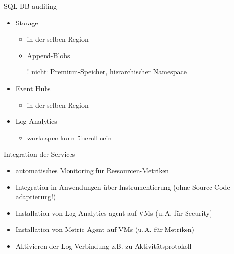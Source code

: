 \begin{flashcard}[Definition]{SQL DB auditing}
  \begin{itemize}
    \item Storage
      \begin{itemize}
        \item in der selben Region
        \item Append-Blobs
        \item[!] nicht: Premium-Speicher, hierarchischer Namespace
      \end{itemize}
    \item Event Hubs
      \begin{itemize}
        \item in der selben Region
      \end{itemize}
    \item Log Analytics
      \begin{itemize}
        \item worksapce kann überall sein
      \end{itemize}
  \end{itemize}
\end{flashcard}



\begin{flashcard}[Definition]{Integration der Services}
  \begin{itemize}
    \item automatisches Monitoring für Ressourcen-Metriken
    \item Integration in Anwendungen über Instrumentierung\newline
      (ohne Source-Code adaptierung!)
    \item Installation von Log Analytics agent auf VMs (u.\,A. für Security)
    \item Installation von Metric Agent auf VMs (u.\,A. für Metriken)
    \item Aktivieren der Log-Verbindung z.B. zu Aktivitätsprotokoll
  \end{itemize}
\end{flashcard}

